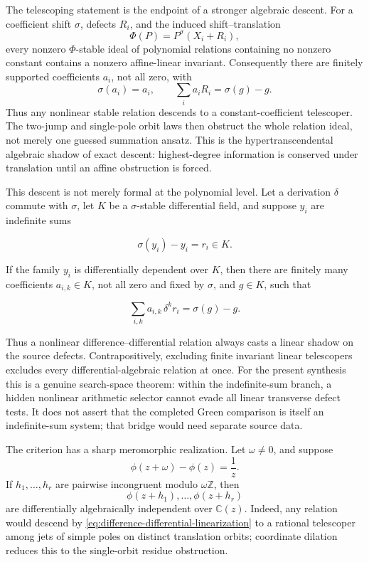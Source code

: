 \documentclass[11pt]{article}
\theoremstyle{definition}
\theoremstyle{remark}
\begin{document}
The telescoping statement is the endpoint of a stronger algebraic descent.
For a coefficient shift \(\sigma\), defects \(R_i\), and the induced
shift--translation
\[
             \Phi(P)=P^\sigma(X_i+R_i),
\]
every nonzero \(\Phi\)-stable ideal of polynomial relations containing no
nonzero constant contains a nonzero affine-linear invariant.  Consequently
there are finitely supported coefficients \(a_i\), not all zero, with
\[
 \sigma(a_i)=a_i,\qquad
              \sum_i a_iR_i=\sigma(g)-g .
\]
Thus any nonlinear stable relation descends to a constant-coefficient
telescoper.  The two-jump and single-pole orbit laws then obstruct the whole
relation ideal, not merely one guessed summation ansatz.  This is the
hypertranscendental algebraic shadow of exact descent: highest-degree
information is conserved under translation until an affine obstruction is
forced.

This descent is not merely formal at the polynomial level.  Let a derivation
\(\delta\) commute with \(\sigma\), let \(K\) be a \(\sigma\)-stable
differential field, and suppose \(y_i\) are indefinite sums


\[
                 \sigma(y_i)-y_i=r_i\in K .
\]


If the family \(y_i\) is differentially dependent over \(K\), then there are
finitely many coefficients \(a_{i,k}\in K\), not all zero and fixed by
\(\sigma\), and \(g\in K\), such that


\[
       \sum_{i,k}a_{i,k}\,\delta^k r_i=\sigma(g)-g .
\tag{6.9a}\label{eq:difference-differential-linearization}
\]


Thus a nonlinear difference--differential relation always casts a linear
shadow on the source defects.  Contrapositively, excluding finite invariant
linear telescopers excludes every differential-algebraic relation at once.
For the present synthesis this is a genuine search-space theorem: within the
indefinite-sum branch, a hidden nonlinear arithmetic selector cannot evade
all linear transverse defect tests.  It does not assert that the completed
Green comparison is itself an indefinite-sum system; that bridge would need
separate source data.

The criterion has a sharp meromorphic realization.  Let \(\omega\ne0\), and
suppose
\[
       \phi(z+\omega)-\phi(z)=\frac1z .
\]
If \(h_1,\ldots,h_r\) are pairwise incongruent modulo \(\omega\mathbb Z\),
then
\[
                 \phi(z+h_1),\ldots,\phi(z+h_r)
\tag{6.9b}\label{eq:scaled-digamma-independence}
\]
are differentially algebraically independent over \(\mathbb C(z)\).
Indeed, any relation would descend by
\eqref{eq:difference-differential-linearization} to a rational telescoper
among jets of simple poles on distinct translation orbits; coordinate
dilation reduces this to the single-orbit residue obstruction.
\end{document}
